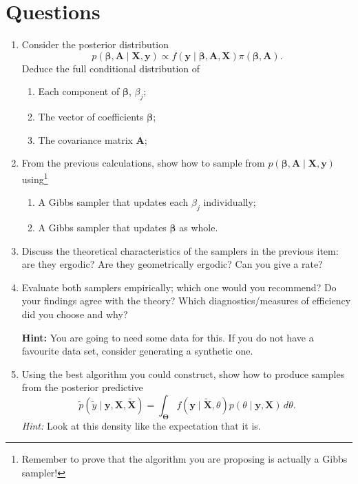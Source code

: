 \documentclass[a4paper,10pt, notitlepage]{report}
\newcommand{\bX}{ \boldsymbol{X}} %
\newcommand{\by}{ \boldsymbol{y} } %
\newcommand{\bb}{ \boldsymbol{\beta} }
\newcommand{\ba}{ \boldsymbol{A} }
\begin{document}
\section*{Questions}

\begin{enumerate}
 \item Consider the posterior distribution
 \begin{equation*}
     p\left(\bb, \ba \mid \bX, \by \right) \propto f\left(\by \mid \bb, \ba, \bX \right)\pi\left(\bb, \ba\right).
 \end{equation*}
 Deduce the full conditional distribution of
 \begin{enumerate}
     \item Each component of $\bb$, $\beta_j$;
     \item The vector of coefficients $\bb$;
     \item The covariance matrix $\ba$;
 \end{enumerate}
 \item From the previous calculations, show how to sample from $p\left(\bb, \ba \mid \bX, \by \right)$ using\footnote{Remember to prove that the algorithm you are proposing is actually a Gibbs sampler!} 
 \begin{enumerate}
     \item A Gibbs sampler that updates each $\beta_j$ individually;
     \item A Gibbs sampler that updates $\bb$ as whole.
 \end{enumerate}
 \item Discuss the theoretical characteristics of the samplers in the previous item: are they ergodic? Are they geometrically ergodic? Can you give a rate?
 \item Evaluate both samplers empirically; which one would you recommend? Do your findings agree with the theory? Which diagnostics/measures of efficiency did you choose and why?

\textbf{Hint:} You are going to need some data for this. If you do not have a favourite data set, consider generating a synthetic one.
 
 \item Using the best algorithm you could construct, show how to produce samples from the posterior predictive
\begin{equation*}
    \tilde{p}(\tilde{y} \mid \boldsymbol{y}, \bX, \tilde{\bX}) = \int_{\boldsymbol{\Theta}} f(\by \mid \tilde{\bX}, \theta) p(\theta \mid \by, \bX)\,d\theta.
\end{equation*}
 \textit{Hint:} Look at this density like the expectation that it is.
 \end{enumerate}
% 
% 
% 
\end{document}
